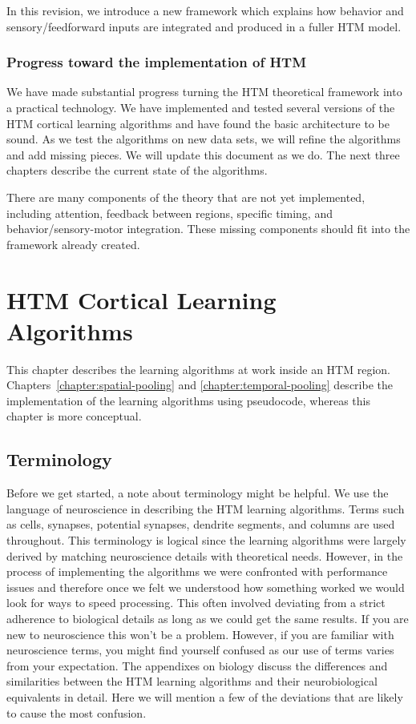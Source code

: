 \documentclass{report}
\begin{document}
In this revision, we introduce a new framework which explains how 
behavior and sensory/feedforward inputs are integrated and produced in a
fuller HTM model.

\subsection*{Progress toward the implementation of HTM}

We have made substantial progress turning the HTM theoretical
framework into a practical technology. We have implemented and tested
several versions of the HTM cortical learning algorithms and have
found the basic architecture to be sound. As we test the algorithms on
new data sets, we will refine the algorithms and add missing
pieces. We will update this document as we do. The next three chapters
describe the current state of the algorithms.

There are many components of the theory that are not yet implemented,
including attention, feedback between regions, specific timing, and
behavior/sensory-motor integration. These missing components should
fit into the framework already created.

\chapter{HTM Cortical Learning Algorithms}
\label{chapter:learning}

This chapter describes the learning algorithms at work inside an HTM
region. Chapters~\ref{chapter:spatial-pooling} and
\ref{chapter:temporal-pooling} describe the implementation of the
learning algorithms using pseudocode, whereas this chapter is more
conceptual.

\section*{Terminology}

Before we get started, a note about terminology might be helpful. We
use the language of neuroscience in describing the HTM learning
algorithms. Terms such as cells, synapses, potential synapses,
dendrite segments, and columns are used throughout. This terminology
is logical since the learning algorithms were largely derived by
matching neuroscience details with theoretical needs. However, in the
process of implementing the algorithms we were confronted with
performance issues and therefore once we felt we understood how
something worked we would look for ways to speed processing. This
often involved deviating from a strict adherence to biological details
as long as we could get the same results. If you are new to
neuroscience this won't be a problem. However, if you are familiar
with neuroscience terms, you might find yourself confused as our use
of terms varies from your expectation. The appendixes on biology
discuss the differences and similarities between the HTM learning
algorithms and their neurobiological equivalents in detail. Here we
will mention a few of the deviations that are likely to cause the most
confusion.
\end{document}
